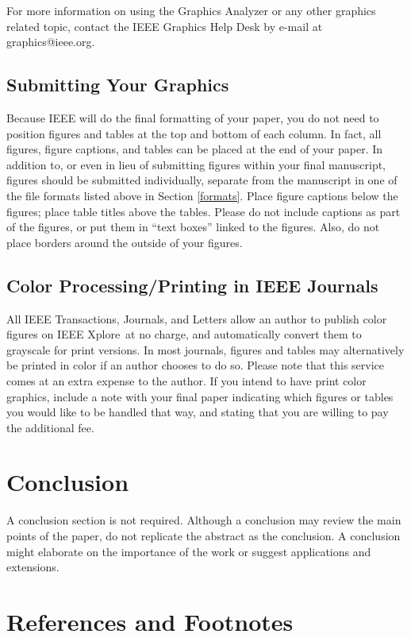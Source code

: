 \documentclass[journal,twoside,web]{ieeecolor}
\begin{document}
For more information on using the Graphics Analyzer or any other graphics 
related topic, contact the IEEE Graphics Help Desk by e-mail at 
graphics@ieee.org.

\subsection{Submitting Your Graphics}
Because IEEE will do the final formatting of your paper,
you do not need to position figures and tables at the top and bottom of each 
column. In fact, all figures, figure captions, and tables can be placed at 
the end of your paper. In addition to, or even in lieu of submitting figures 
within your final manuscript, figures should be submitted individually, 
separate from the manuscript in one of the file formats listed above in 
Section \ref{formats}. Place figure captions below the figures; place table titles 
above the tables. Please do not include captions as part of the figures, or 
put them in ``text boxes'' linked to the figures. Also, do not place borders 
around the outside of your figures.

\subsection{Color Processing/Printing in IEEE Journals}
All IEEE Transactions, Journals, and Letters allow an author to publish 
color figures on IEEE Xplore\textregistered\ at no charge, and automatically 
convert them to grayscale for print versions. In most journals, figures and 
tables may alternatively be printed in color if an author chooses to do so. 
Please note that this service comes at an extra expense to the author. If 
you intend to have print color graphics, include a note with your final 
paper indicating which figures or tables you would like to be handled that 
way, and stating that you are willing to pay the additional fee.

\section{Conclusion}
A conclusion section is not required. Although a conclusion may review the 
main points of the paper, do not replicate the abstract as the conclusion. A 
conclusion might elaborate on the importance of the work or suggest 
applications and extensions. 

\section*{References and Footnotes}
\end{document}

